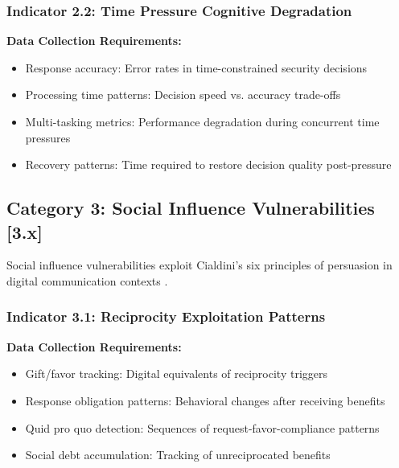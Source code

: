 \documentclass[10pt,twocolumn]{IEEEtran}
\begin{document}
\subsubsection{Indicator 2.2: Time Pressure Cognitive Degradation}

\textbf{Data Collection Requirements:}
\begin{itemize}
\item Response accuracy: Error rates in time-constrained security decisions
\item Processing time patterns: Decision speed vs. accuracy trade-offs
\item Multi-tasking metrics: Performance degradation during concurrent time pressures
\item Recovery patterns: Time required to restore decision quality post-pressure
\end{itemize}

\subsection{Category 3: Social Influence Vulnerabilities [3.x]}

Social influence vulnerabilities exploit Cialdini's six principles of persuasion in digital communication contexts \cite{cialdini2007}.

\subsubsection{Indicator 3.1: Reciprocity Exploitation Patterns}

\textbf{Data Collection Requirements:}
\begin{itemize}
\item Gift/favor tracking: Digital equivalents of reciprocity triggers
\item Response obligation patterns: Behavioral changes after receiving benefits
\item Quid pro quo detection: Sequences of request-favor-compliance patterns
\item Social debt accumulation: Tracking of unreciprocated benefits
\end{itemize}
\end{document}
